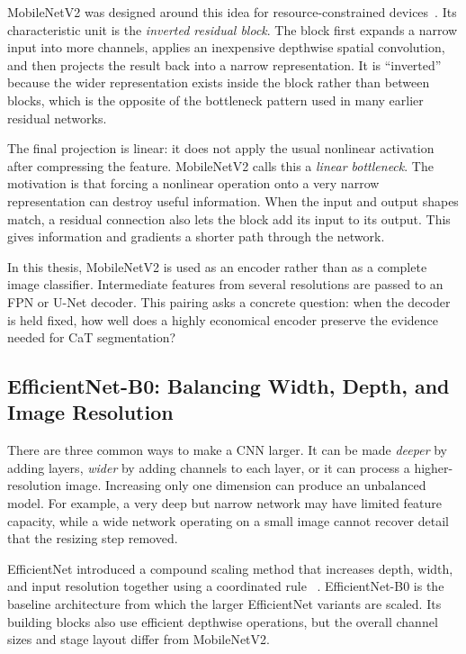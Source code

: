 MobileNetV2 was designed around this idea for resource-constrained
devices~\cite{sandler2018mobilenetv2}. Its characteristic unit is the
\emph{inverted residual block}. The block first expands a narrow input into
more channels, applies an inexpensive depthwise spatial convolution, and then
projects the result back into a narrow representation. It is ``inverted''
because the wider representation exists inside the block rather than between
blocks, which is the opposite of the bottleneck pattern used in many earlier
residual networks.

The final projection is linear: it does not apply the usual nonlinear
activation after compressing the feature. MobileNetV2 calls this a
\emph{linear bottleneck}. The motivation is that forcing a nonlinear
operation onto a very narrow representation can destroy useful information.
When the input and output shapes match, a residual connection also lets the
block add its input to its output. This gives information and gradients a
shorter path through the network.

In this thesis, MobileNetV2 is used as an encoder rather than as a complete
image classifier. Intermediate features from several resolutions are passed to
an FPN or U-Net decoder. This pairing asks a concrete question: when the
decoder is held fixed, how well does a highly economical encoder preserve the
evidence needed for CaT segmentation?

\subsection{EfficientNet-B0: Balancing Width, Depth, and Image Resolution}

There are three common ways to make a CNN larger. It can be made
\emph{deeper} by adding layers, \emph{wider} by adding channels to each layer,
or it can process a higher-resolution image. Increasing only one dimension can
produce an unbalanced model. For example, a very deep but narrow network may
have limited feature capacity, while a wide network operating on a small image
cannot recover detail that the resizing step removed.

EfficientNet introduced a compound scaling method that increases depth, width,
and input resolution together using a coordinated rule
~\cite{tan2019efficientnet}. EfficientNet-B0 is the baseline architecture from
which the larger EfficientNet variants are scaled. Its building blocks also
use efficient depthwise operations, but the overall channel sizes and stage
layout differ from MobileNetV2.


